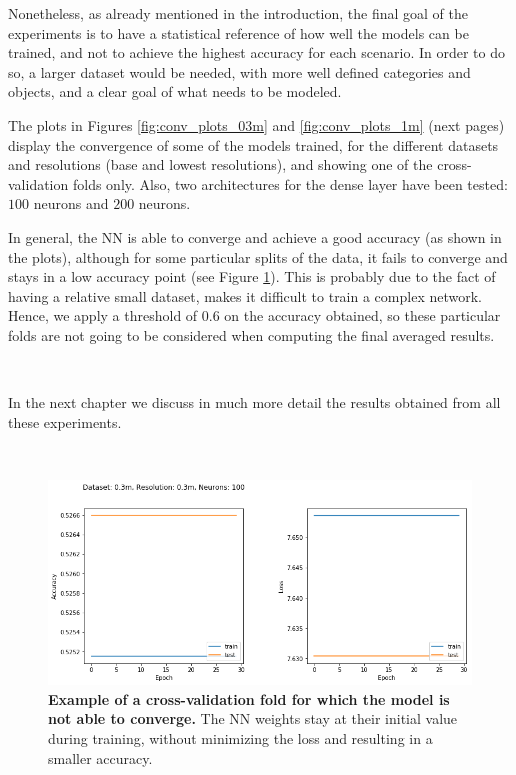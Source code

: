 Nonetheless, as already mentioned in the introduction, the final goal of the experiments is to have a statistical reference of how well the models can be trained, and not to achieve the highest accuracy for each scenario. In order to do so, a larger dataset would be needed, with more well defined categories and objects, and a clear goal of what needs to be modeled.

The plots in Figures \ref{fig:conv_plots_03m} and \ref{fig:conv_plots_1m} (next pages) display the convergence of some of the models trained, for the different datasets and resolutions (base and lowest resolutions), and showing one of the cross-validation folds only. Also, two architectures for the dense layer have been tested: $100$ neurons and $200$ neurons. 

In general, the NN is able to converge and achieve a good accuracy (as shown in the plots), although for some particular splits of the data, it fails to converge and stays in a low accuracy point (see Figure \ref{fig:bad_convergence_plot}). This is probably due to the fact of having a relative small dataset, makes it difficult to train a complex network. Hence, we apply a threshold of $0.6$ on the accuracy obtained, so these particular folds are not going to be considered when computing the final averaged results.

\

In the next chapter we discuss in much more detail the results obtained from all these experiments.

\

\begin{figure}[h!]
	\centering
	\includegraphics[width=\textwidth]{Figures/results/bad_convergence_plot.png}
	\captionsetup{width=1\linewidth}
	\caption{\textbf{Example of a cross-validation fold for which the model is not able to converge.} The NN weights stay at their initial value during training, without minimizing the loss and resulting in a smaller accuracy.}
	\label{fig:bad_convergence_plot}
\end{figure}

